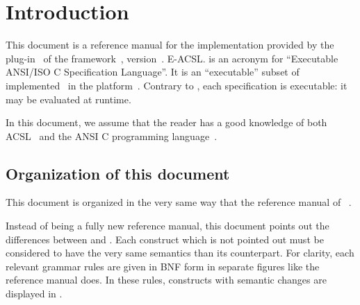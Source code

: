 \chapter{Introduction}

This document is a reference manual for
%
{the \eacsl implementation provided by the \eacsl plug-in~\cite{eacsl-plugin}
  of the \framac framework~\cite{framac}, version~\framacversion.}%
{E-ACSL.}
\eacsl is an acronym for ``Executable ANSI/ISO C
Specification Language''. It is an ``executable'' subset of
\acsl~\cite{acsl} implemented~\cite{acslimplem} in the \framac
platform~\cite{framac}. Contrary to \acsl, each \eacsl specification is
executable: it may be evaluated at runtime.

In this document, we assume that the reader has a good knowledge of both
ACSL~\cite{acsl} and the ANSI C programming language~\cite{standardc99,KR88}.

\section{Organization of this document}

This document is organized in the very same way that the reference manual of
\acsl~\cite{acsl}.

Instead of being a fully new reference manual, this document points out the
differences between \eacsl and \acsl. Each \eacsl construct which is not pointed
out must be considered to have the very same semantics than its \acsl
counterpart. For clarity, each relevant grammar rules are given in BNF form
in separate figures like the \acsl reference manual does. In these rules,
constructs with semantic changes are displayed in .

